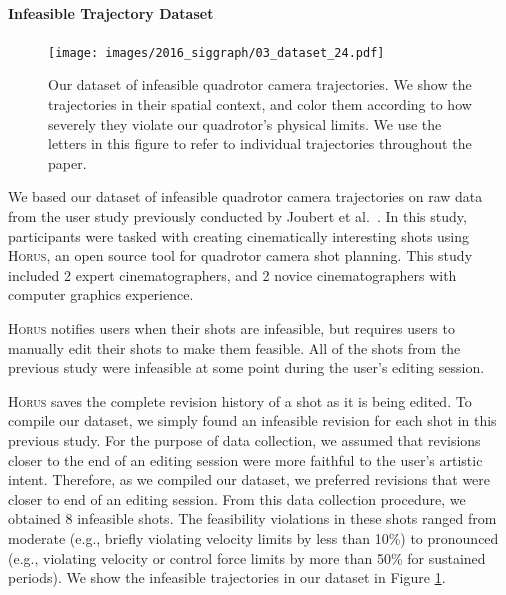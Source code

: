 \paragraph{Infeasible Trajectory Dataset}

\begin{figure}[th!]
\centering
\texttt{[image: images/2016\_siggraph/03\_dataset\_24.pdf]}
\caption{
Our dataset of infeasible quadrotor camera trajectories.
We show the trajectories in their spatial context, and color them according to how severely they violate our quadrotor's physical limits.
We use the letters in this figure to refer to individual trajectories throughout the paper.
}
\label{fig:dataset}
\end{figure}

We based our dataset of infeasible quadrotor camera trajectories on raw data from the user study previously conducted by Joubert et al.~.
In this study, participants were tasked with creating cinematically interesting shots using \textsc{Horus}, an open source tool for quadrotor camera shot planning.
This study included 2 expert cinematographers, and 2 novice cinematographers with computer graphics experience.

\textsc{Horus} notifies users when their shots are infeasible, but requires users to manually edit their shots to make them feasible.
All of the shots from the previous study were infeasible at some point during the user's editing session.

\textsc{Horus} saves the complete revision history of a shot as it is being edited.
To compile our dataset, we simply found an infeasible revision for each shot in this previous study.
For the purpose of data collection, we assumed that revisions closer to the end of an editing session were more faithful to the user's artistic intent.
Therefore, as we compiled our dataset, we preferred revisions that were closer to end of an editing session. 
From this data collection procedure, we obtained 8 infeasible shots.
The feasibility violations in these shots ranged from moderate (e.g., briefly violating velocity limits by less than 10\%) to pronounced (e.g., violating velocity or control force limits by more than 50\% for sustained periods). 
We show the infeasible trajectories in our dataset in Figure \ref{fig:dataset}.

